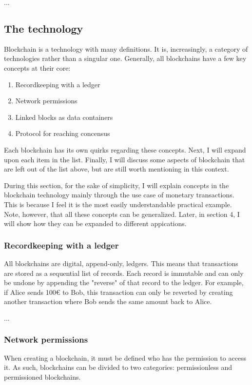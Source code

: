 ...


\subsection{The technology}

Blockchain is a technology with many definitions. It is, increasingly,
a category of technologies rather than a singular one. Generally, all 
blockchains have a few key concepts at their core:
\begin{enumerate}
  \item Recordkeeping with a ledger
  \item Network permissions
  \item Linked blocks as data containers
  \item Protocol for reaching concensus
\end{enumerate}
Each blockchain has its own quirks regarding these concepts. Next, I
will expand upon each item in the list. Finally, I will discuss some
aspects of blockchain that are left out of the list above, but are
still worth mentioning in this context. 

During this section, for the sake of simplicity, I will explain
concepts in the blockchain technology mainly through the use case of
monetary transactions. This is because I feel it is the most easily
understandable practical example. Note, however, that all these
concepts can be generalized. Later, in section 4, I will show
how they can be expanded to different appications.

\subsubsection{Recordkeeping with a ledger}
All blockchains are digital, append-only, ledgers. This means that
transactions are stored as a sequential list of records. Each record is
immutable and can only be undone by appending the "reverse" of that
record to the ledger. For example, if Alice sends 100€ to Bob, this
transaction can only be reverted by creating another transaction where
Bob sends the same amount back to Alice.

...

\subsubsection{Network permissions}
When creating a blockchain, it must be defined who has the permission
to access it. As such, blockchains can be divided to two categories:
permissionless and permissioned blockchains.

